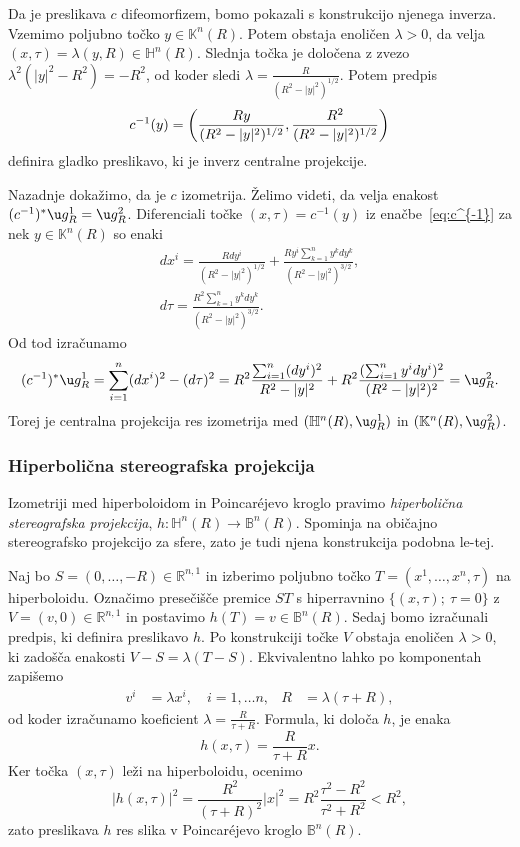\documentclass[a4paper]{article}
\begin{document}
Da je preslikava $c$ difeomorfizem, bomo pokazali s konstrukcijo njenega inverza.
Vzemimo poljubno točko $y \in \mathbb{K}^{n}(R)$. Potem obstaja enoličen $\lambda>0$, da velja $(x, \tau) = \lambda (y,R) \in \mathbb{H}^{n}(R)$. Slednja točka je določena z zvezo $\lambda^2 (|y|^2-R^2)=-R^2$, od koder sledi $\lambda = \frac{R}{(R^2-|y|^2)^{1/2}}$.
Potem predpis
\begin{equation}\label{eq:c^{-1}}
c^{-1}(y) = \left( \frac{Ry}{(R^2-|y|^2)^{1/2}}, \frac{R^2}{(R^2-|y|^2)^{1/2}} \right)
\end{equation}
definira gladko preslikavo, ki je inverz centralne projekcije.

Nazadnje dokažimo, da je $c$ izometrija. Želimo videti, da velja enakost $(c^{-1})^{*} \u g_{R}^{1} = \u g_{R}^{2}$.
Diferenciali točke $(x, \tau) = c^{-1}(y)$ iz enačbe~\ref{eq:c^{-1}} za nek $y \in \mathbb{K}^{n}(R)$ so enaki
\begin{gather*}
dx^{i} = \frac{Rdy^{i}}{(R^2-|y|^2)^{1/2}} + \frac{Ry^{i} \sum_{k=1}^{n}y^{k}dy^{k}}{(R^2-|y|^2)^{3/2}}, \\
d\tau = \frac{R^2 \sum_{k=1}^{n}y^{k}dy^{k}}{(R^2-|y|^2)^{3/2}}.
\end{gather*}
Od tod izračunamo
\[ (c^{-1})^{*} \u g_{R}^{1} = \sum_{i=1}^{n} (dx^{i})^2 - (d\tau)^2 = R^2 \frac{\sum_{i=1}^{n}(dy^{i})^2}{R^2-|y|^2} + R^2 \frac{(\sum_{i=1}^{n}y^{i}dy^{i})^2}{(R^2-|y|^2)^2} = \u g_{R}^{2}. \]
Torej je centralna projekcija res izometrija med $(\mathbb{H}^{n}(R), \u g_{R}^{1})$ in $(\mathbb{K}^{n}(R), \u g_{R}^{2})$.

\subsubsection{Hiperbolična stereografska projekcija}
Izometriji med hiperboloidom in Poincar\'ejevo kroglo pravimo \emph{hiperbolična stereografska projekcija}, $h \colon \mathbb{H}^{n}(R) \to \mathbb{B}^{n}(R)$. Spominja na običajno stereografsko projekcijo za sfere, zato je tudi njena konstrukcija podobna le-tej.

Naj bo $S=(0, \dots , -R) \in \mathbb{R}^{n,1}$ in izberimo poljubno točko $T=(x^{1}, \dots , x^{n}, \tau)$ na hiperboloidu. Označimo presečišče premice $ST$ s hiperravnino $\{ (x, \tau); \ \tau=0 \}$ z $V=(v,0) \in \mathbb{R}^{n,1}$ in postavimo $h(T)=v \in \mathbb{B}^{n}(R)$.
Sedaj bomo izračunali predpis, ki definira preslikavo $h$.
Po konstrukciji točke $V$ obstaja enoličen $\lambda>0$, ki zadošča enakosti $V-S=\lambda(T-S)$. Ekvivalentno lahko po komponentah zapišemo
\begin{align*}
v^{i} &= \lambda x^{i}, \quad  i=1, \dots n, & R &= \lambda(\tau+R),
\end{align*}
od koder izračunamo koeficient $\lambda = \frac{R}{\tau+R}$. Formula, ki določa $h$, je enaka
\begin{equation}\label{eq: hip-ster-proj}
h(x,\tau) = \frac{R}{\tau+R}x.
\end{equation}
Ker točka $(x,\tau)$ leži na hiperboloidu, ocenimo
\[ |h(x,\tau)|^2 = \frac{R^2}{(\tau+R)^2} |x|^2 = R^2 \frac{\tau^2-R^2}{\tau^2+R^2} < R^2, \]
zato preslikava $h$ res slika v Poincar\'ejevo kroglo $\mathbb{B}^{n}(R)$.
\end{document}
